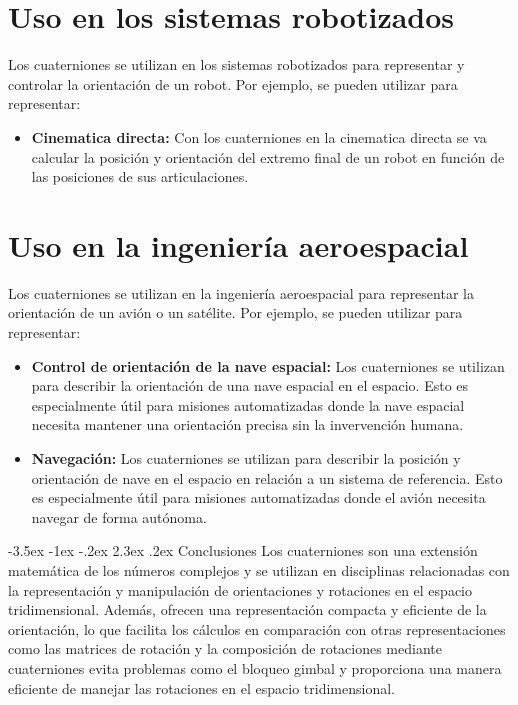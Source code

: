 \documentclass[11pt]{report}
\makeatletter
\renewcommand\chapter{\@startsection{chapter}{0}{\z@}%
    {-3.5ex \@plus -1ex \@minus -.2ex}%
    {2.3ex \@plus.2ex}%
    {\normalfont\Large\bfseries}}
\makeatother
\begin{document}
\section{Uso en los sistemas robotizados}
Los cuaterniones se utilizan en los sistemas robotizados para representar y controlar la orientación de un robot. Por ejemplo, se pueden utilizar para representar:
\begin{itemize}
  \item \textbf{Cinematica directa: } Con los cuaterniones en la cinematica directa se va calcular la posición y orientación del extremo final de un robot en función de las posiciones de sus
        articulaciones.
\end{itemize}

\section{Uso en la ingeniería aeroespacial}
Los cuaterniones se utilizan en la ingeniería aeroespacial para representar la orientación de un avión o un satélite. Por ejemplo, se pueden utilizar para representar:
\begin{itemize}
  \item \textbf{Control de orientación de la nave espacial: } Los cuaterniones se utilizan para describir la orientación de una nave espacial en el espacio. Esto es especialmente útil para misiones
        automatizadas donde la nave espacial necesita mantener una orientación precisa sin la invervención humana.
  \item \textbf{Navegación: } Los cuaterniones se utilizan para describir la posición y orientación de nave en el espacio en relación a un sistema de referencia. Esto es especialmente útil para misiones automatizadas donde el avión necesita
        navegar de forma autónoma.
\end{itemize}

\newpage

\chapter{Conclusiones}
Los cuaterniones son una extensión matemática de los números complejos y se utilizan en disciplinas relacionadas con la representación y manipulación de orientaciones y rotaciones en el espacio tridimensional.
Además, ofrecen una representación compacta y eficiente de la orientación, lo que facilita los cálculos en comparación con otras representaciones como las matrices de rotación y la composición de rotaciones 
mediante cuaterniones evita problemas como el bloqueo gimbal y proporciona una manera eficiente de manejar las rotaciones en el espacio tridimensional.
\end{document}
